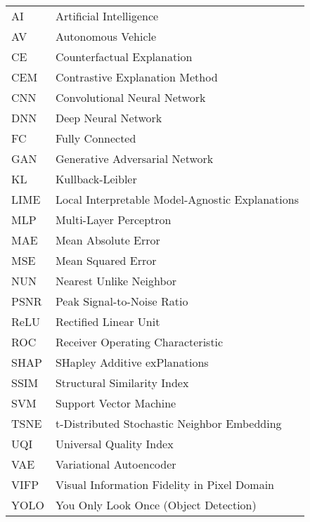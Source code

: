 \begin{center}
\renewcommand{\arraystretch}{1.2}
\begin{tabular}{ll}
AI & Artificial Intelligence \\
AV & Autonomous Vehicle \\
CE & Counterfactual Explanation \\
CEM & Contrastive Explanation Method \\
CNN & Convolutional Neural Network \\
DNN & Deep Neural Network \\
FC & Fully Connected \\
GAN & Generative Adversarial Network \\
KL & Kullback-Leibler \\
LIME & Local Interpretable Model-Agnostic Explanations \\
MLP & Multi-Layer Perceptron \\
MAE & Mean Absolute Error \\
MSE & Mean Squared Error \\
NUN & Nearest Unlike Neighbor \\
PSNR & Peak Signal-to-Noise Ratio \\
ReLU & Rectified Linear Unit \\
ROC & Receiver Operating Characteristic \\
SHAP & SHapley Additive exPlanations \\
SSIM & Structural Similarity Index \\
SVM & Support Vector Machine \\
TSNE & t-Distributed Stochastic Neighbor Embedding \\
UQI & Universal Quality Index \\
VAE & Variational Autoencoder \\
VIFP & Visual Information Fidelity in Pixel Domain \\
YOLO & You Only Look Once (Object Detection) \\
\end{tabular}
\end{center}
